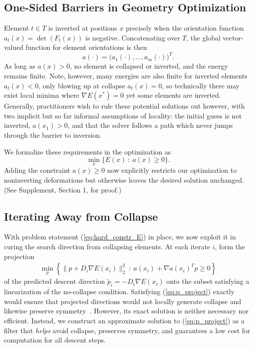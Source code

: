 \subsection{One-Sided Barriers in Geometry Optimization}

Element $t \in T$ is inverted at positions $x$ precisely when the orientation function
$a_t(x) = \det(F_t(x))$ is negative. Concatenating over $T$, the global vector-valued function for element
orientations is then
\begin{equation}
a(\cdot) = \big(a_1(\cdot), ..., a_m(\cdot) \big)^T.
\end{equation}
As long as $a(x) > 0$, no element is collapsed or inverted, and the energy remains finite.
Note, however, many energies are also finite for inverted elements $a_t(x)<0$, only blowing up
at collapse $a_t(x)=0$, so technically there may exist local minima where $\nabla E(x^*)=0$
yet some elements are inverted. Generally, practitioners wish to rule these potential solutions
out however, with two implicit but so far informal assumptions of locality: 
the initial guess is not inverted, $a(x_1)>0$, and that the solver follows a path
which never jumps through the barrier to inversion. 

We formalize these requirements in the optimization as
\begin{equation}
\label{eq:hard_constr_E}
\min_x \{E(x) \ : \  a(x) \geq 0 \}.
\end{equation}
Adding the constraint $a(x) \geq  0$ now explicitly restricts our
optimization to noninverting deformations but otherwise leaves the
desired solution unchanged. (See Supplement, Section 1, for proof.)

\subsection{Iterating Away from Collapse}

With problem statement (\ref{eq:hard_constr_E}) in place, we now exploit it in curing the search direction from
collapsing elements. At each iterate $i$, form the projection  
\begin{align}
\label{eq:p_project}
 \min_p \left\{ \| p + D_i \nabla E(x_i) \|_2^2 \> : \> a(x_i) + \nabla a(x_i)^T p \geq 0 \right\} 
\end{align}
of the predicted descent direction $\tilde{p}_i = -D_i \nabla E(x_i)$ onto 
the subset satisfying a linearization of the no-collapse condition.
Satisfying (\ref{eq:p_project}) exactly would ensure that projected
directions would not locally generate collapse and likewise preserve
symmetry~\cite{SKVTG2012}. However, its exact solution is neither
necessary nor efficient. Instead, we construct an approximate
solution to (\ref{eq:p_project}) as a filter that \emph{helps}
avoid collapse, preserves symmetry, and guarantees a low cost for
computation for all descent steps. 

